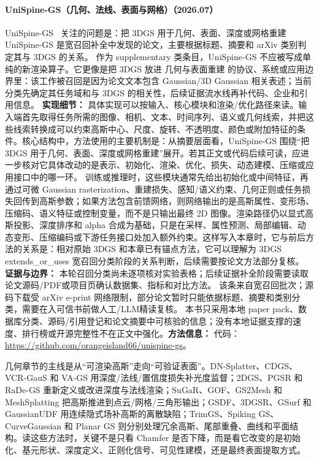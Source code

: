 \paragraph{UniSpine-GS（几何、法线、表面与网格）（2026.07）}
UniSpine-GS~\cite{2607_04923} 关注的问题是：把 3DGS 用于几何、表面、深度或网格重建 UniSpine-GS 是宽召回补全中发现的论文，主要根据标题、摘要和 arXiv 类别判定其与 3DGS 的关系。
作为 supplementary 类条目，UniSpine-GS 不应被写成单纯的新渲染算子。它更像是把 3DGS 放进 几何与表面重建 的协议、系统或应用边界里：该工作被召回是因为论文文本包含 Gaussian/3D Gaussian 相关表述；当前分类先确定其任务域和与 3DGS 的相关性，后续证据流水线再补代码、企业和引用信息。
\textbf{实现细节：} 具体实现可以按输入、核心模块和渲染/优化路径来读。输入端首先取得任务所需的图像、相机、文本、时间序列、语义或几何线索，并把这些线索转换成可以约束高斯中心、尺度、旋转、不透明度、颜色或附加特征的条件。核心结构中，方法使用的主要机制是：从摘要层面看，UniSpine-GS 围绕“把 3DGS 用于几何、表面、深度或网格重建”展开。若其正文或代码后续可读，应进一步核对它具体改动的是表示、初始化、渲染、优化、损失、动态建模、压缩或应用接口中的哪一环。 训练或推理时，这些模块通常先给出初始化或中间特征，再通过可微 Gaussian rasterization、重建损失、感知/语义约束、几何正则或任务损失回传到高斯参数；如果方法包含前馈网络，则网络输出的是高斯属性、变形场、压缩码、语义特征或控制变量，而不是只输出最终 2D 图像。渲染路径仍以显式高斯投影、深度排序和 alpha 合成为基础，只是在采样、属性预测、局部编辑、动态变形、压缩编码或下游任务接口处加入额外约束。这样写入本章时，它与前后方法的关系是：相对原始 3DGS 和本章已有锚点方法，它可以理解为 3DGS extends\_or\_uses 宽召回分类阶段的关系判断，后续需要按论文方法部分复核。
\textbf{证据与边界：} 本轮召回分类尚未逐项核对实验表格；后续证据补全阶段需要读取论文源码/PDF或项目页确认数据集、指标和对比方法。 该条来自宽召回批次；源码下载受 arXiv e-print 网络限制，部分论文暂时只能依据标题、摘要和类别分类，需要在入可信书前做人工/LLM精读复核。 本书只采用本地 paper pack、数据库分类、源码/引用登记和论文摘要中可核验的信息；没有本地证据支撑的速度、排行榜或开源完整性不在正文中强化。\textbf{方法信息：} 代码：\url{https://github.com/orangeisland66/unispine-gs}。


几何章节的主线是从“可渲染高斯”走向“可验证表面”。DN-Splatter、CDGS、VCR-GauS 和 VA-GS 用深度/法线/置信度损失补光度监督；2DGS、PGSR 和 RaDe-GS 重新定义或改进深度与法线渲染；SuGaR、GOF、GS2Mesh 和 MeshSplatting 把高斯推进到点云/网格/三角形输出；GSDF、3DGSR、GSurf 和 GaussianUDF 用连续隐式场补高斯的离散缺陷；TrimGS、Spiking GS、CurveGaussian 和 Planar GS 则分别处理冗余高斯、尾部重叠、曲线和平面结构。读这些方法时，关键不是只看 Chamfer 是否下降，而是看它改变的是初始化、基元形状、深度定义、正则化信号、可见性建模，还是最终表面提取方式。

